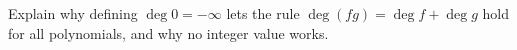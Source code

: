 Explain why defining $\deg0=-\infty$ lets the rule $\deg(fg)=\deg f+\deg g$ hold for all polynomials, and why no integer value works.
